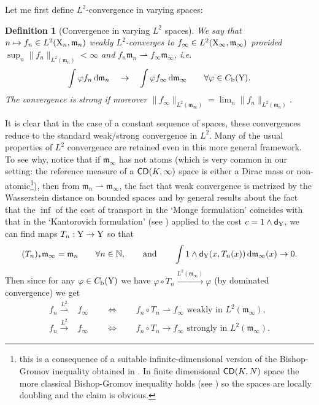 \documentclass[11pt]{article}
\numberwithin{equation}{section}
\newtheorem{definition}[theorem]{Definition}
\newcommand{\N}{\mathbb{N}}
\newcommand{\X}{{\rm X}}
\newcommand{\Y}{{\rm Y}}
\newcommand{\sfd}{{\sf d}}
\newcommand{\mm}{{\mathfrak m}}
\newcommand{\CD}{{\sf CD}}
\renewcommand{\d}{{\rm d}}
\renewcommand{\b}{{\rm b}}
\newcommand{\weakto}{\rightharpoonup}
\begin{document}
Let me first define  $L^2$-convergence in varying spaces:
\begin{definition}[Convergence in varying $L^2$ spaces]\label{def:convl2var} We say that $n\mapsto f_n\in L^2(\X_n,\mm_n)$ weakly $L^2$-converges to $f_\infty\in L^2(\X_\infty,\mm_\infty)$ provided $\sup_n\|f_n\|_{L^2(\mm_n)}<\infty$ and $f_n\mm_n\weakto f_\infty\mm_\infty$, i.e.
\[
\int \varphi f_n\,\d\mm_n\quad\to\quad\int \varphi f_\infty\,\d\mm_\infty\qquad\forall \varphi\in C_\b(\Y).
\]
The convergence is strong if moreover $\|f_\infty\|_{L^2(\mm_\infty)}=\lim_n\|f_n\|_{L^2(\mm_n)}$. 
\end{definition}
It is clear that in the case of a constant sequence of spaces, these convergences reduce to the standard weak/strong convergence in  $L^2$. Many of the usual properties of $L^2$ convergence are retained even in this more general framework. To see why, notice that if $\mm_\infty$ has not atoms (which is very common in our setting: the reference measure of a  $\CD(K,\infty)$ space is either a Dirac mass or non-atomic\footnote{this is a consequence of a suitable infinite-dimensional version of the Bishop-Gromov inequality obtained in \cite{Sturm06I}. In finite dimensional $\CD(K,N)$ space the more classical Bishop-Gromov inequality holds (see \cite{Sturm06II}) so the spaces are locally doubling and the claim is obvious.}), then from $\mm_n\weakto\mm_\infty$, the fact that weak convergence is metrized by the Wasserstein distance on bounded spaces and by general results about the fact that the $\inf$ of the cost of transport in the `Monge formulation' coincides with that in the `Kantorovich formulation' (see \cite{Pratelli07}) applied to the cost $c=1\wedge\sfd_\Y$, we can find maps $T_n:\Y\to\Y$ so that 
\begin{equation}
\label{eq:mappeTn}
(T_n)_*\mm_\infty=\mm_n\qquad \forall n\in\N,\qquad\text{and}\qquad \int1\wedge\sfd_\Y(x,T_n(x))\,\d\mm_\infty(x)\to0.
\end{equation}
Then since for any $\varphi\in C_\b(\Y)$ we have $\varphi\circ T_n\stackrel{L^2(\mm_\infty)}\to\varphi$ (by dominated convergence) we  get 
\begin{subequations}
\label{eq:equivl2conv}\begin{align}
\label{eq:equivl2convw}
f_n\stackrel{L^2}\weakto &f_\infty\qquad\Leftrightarrow\qquad  f_n\circ T_n\weakto f_\infty \text{ weakly in }L^2(\mm_\infty),\\
\label{eq:equivl2convs}
f_n\stackrel{L^2}\to& f_\infty\qquad\Leftrightarrow \qquad f_n\circ T_n\to f_\infty \text{ strongly in }L^2(\mm_\infty).
\end{align}
\end{subequations}
\end{document}
